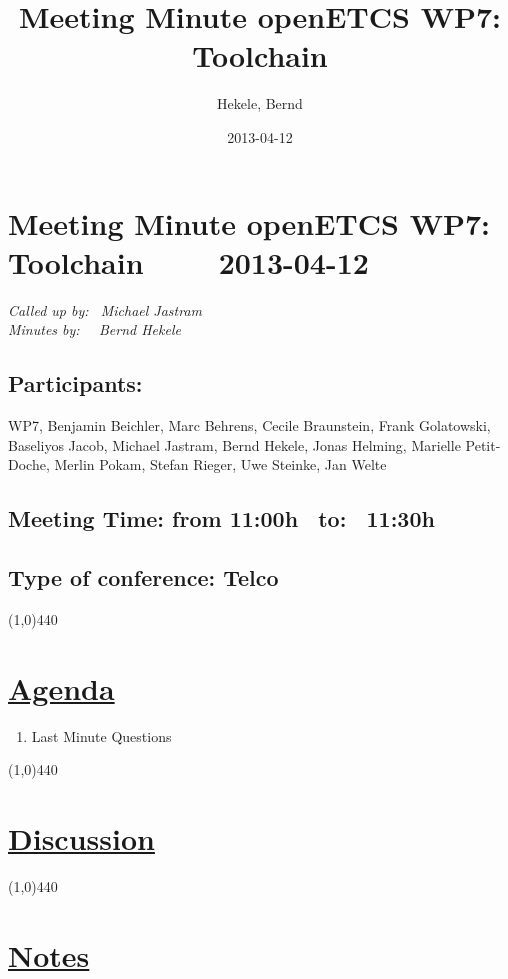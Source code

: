\documentclass[a4paper]{article}
\title{Meeting Minute openETCS WP7: Toolchain}
\author{Hekele, Bernd}
\date{2013-04-12}
\begin{document}
\section*{\large{Meeting Minute openETCS WP7: Toolchain \ \ \ \ 2013-04-12}}

\emph{Called up by: \ Michael Jastram}\\
\emph{Minutes by: \ \  Bernd Hekele}

\subsection*{Participants:} WP7, 
Benjamin Beichler,
Marc Behrens, 
Cecile Braunstein,
Frank Golatowski, 
Baseliyos Jacob,
Michael Jastram, 
Bernd Hekele,
Jonas Helming,
Marielle Petit-Doche, 
Merlin Pokam,
Stefan Rieger, 
Uwe Steinke,
Jan Welte\\


\subsection*{Meeting Time: from 11:00h \ to: \ 11:30h}

\subsection*{Type of conference: Telco}

\line(1,0){440}
\section*{\underline{Agenda}}
\begin{enumerate}
\item Last Minute Questions

\end{enumerate}
\line(1,0){440}
\section*{\underline{Discussion}}



\line(1,0){440}
\section*{\underline{Notes}}
\end{document}
